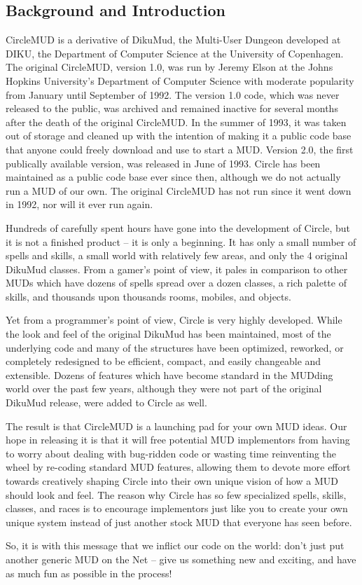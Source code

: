 \documentclass[11pt]{article}
\begin{document}
\subsection{Background and Introduction}
CircleMUD is a derivative of DikuMud, the Multi-User Dungeon developed at DIKU, the Department of Computer Science at the University of Copenhagen.  The original CircleMUD, version 1.0, was run by Jeremy Elson at the Johns Hopkins University's Department of Computer Science with moderate popularity from January until September of 1992.  The version 1.0 code, which was never released to the public, was archived and remained inactive for several months after the death of the original CircleMUD.  In the summer of 1993, it was taken out of storage and cleaned up with the intention of making it a public code base that anyone could freely download and use to start a MUD.  Version 2.0, the first publically available version, was released in June of 1993.  Circle has been maintained as a public code base ever since then, although we do not actually run a MUD of our own. The original CircleMUD has not run since it went down in 1992, nor will it ever run again. 
\par
Hundreds of carefully spent hours have gone into the development of Circle, but it is not a finished product -- it is only a beginning.  It has only a small number of spells and skills, a small world with relatively few areas, and only the 4 original DikuMud classes.  From a gamer's point of view, it pales in comparison to other MUDs which have dozens of spells spread over a dozen classes, a rich palette of skills, and thousands upon thousands rooms, mobiles, and objects.
\par
Yet from a programmer's point of view, Circle is very highly developed.  While the look and feel of the original DikuMud has been maintained, most of the underlying code and many of the structures have been optimized, reworked, or completely redesigned to be efficient, compact, and easily changeable and extensible.  Dozens of features which have become standard in the MUDding world over the past few years, although they were not part of the original DikuMud release, were added to Circle as well.
\par
The result is that CircleMUD is a launching pad for your own MUD ideas.  Our hope in releasing it is that it will free potential MUD implementors from having to worry about dealing with bug-ridden code or wasting time reinventing the wheel by re-coding standard MUD features, allowing them to devote more effort towards creatively shaping Circle into their own unique vision of how a MUD should look and feel.  The reason why Circle has so few specialized spells, skills, classes, and races is to encourage implementors just like you to create your own unique system instead of just another stock MUD that everyone has seen before. 
\par
So, it is with this message that we inflict our code on the world: don't just put another generic MUD on the Net -- give us something new and exciting, and have as much fun as possible in the process! 
\end{document}
